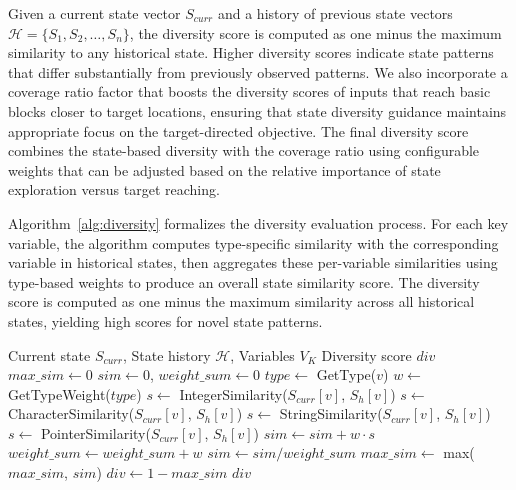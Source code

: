 \documentclass[review]{elsarticle}
\begin{document}
Given a current state vector $S_{curr}$ and a history of previous state vectors $\mathcal{H} = \{S_1, S_2, \ldots, S_n\}$, the diversity score is computed as one minus the maximum similarity to any historical state. Higher diversity scores indicate state patterns that differ substantially from previously observed patterns. We also incorporate a coverage ratio factor that boosts the diversity scores of inputs that reach basic blocks closer to target locations, ensuring that state diversity guidance maintains appropriate focus on the target-directed objective. The final diversity score combines the state-based diversity with the coverage ratio using configurable weights that can be adjusted based on the relative importance of state exploration versus target reaching.

Algorithm~\ref{alg:diversity} formalizes the diversity evaluation process. For each key variable, the algorithm computes type-specific similarity with the corresponding variable in historical states, then aggregates these per-variable similarities using type-based weights to produce an overall state similarity score. The diversity score is computed as one minus the maximum similarity across all historical states, yielding high scores for novel state patterns.

\begin{algorithm}[t]
\caption{State Diversity Evaluation}
\label{alg:diversity}
\begin{algorithmic}[1]
\REQUIRE Current state $S_{curr}$, State history $\mathcal{H}$, Variables $V_K$
\ENSURE Diversity score $div$
\STATE $max\_sim \leftarrow 0$
    \STATE $sim \leftarrow 0$, $weight\_sum \leftarrow 0$
        \STATE $type \leftarrow$ GetType($v$)
        \STATE $w \leftarrow$ GetTypeWeight($type$)
            \STATE $s \leftarrow$ IntegerSimilarity($S_{curr}[v]$, $S_h[v]$)
            \STATE $s \leftarrow$ CharacterSimilarity($S_{curr}[v]$, $S_h[v]$)
            \STATE $s \leftarrow$ StringSimilarity($S_{curr}[v]$, $S_h[v]$)
            \STATE $s \leftarrow$ PointerSimilarity($S_{curr}[v]$, $S_h[v]$)
        \ENDIF
        \STATE $sim \leftarrow sim + w \cdot s$
        \STATE $weight\_sum \leftarrow weight\_sum + w$
    \ENDFOR
    \STATE $sim \leftarrow sim / weight\_sum$
    \STATE $max\_sim \leftarrow$ max($max\_sim$, $sim$)
\ENDFOR
\STATE $div \leftarrow 1 - max\_sim$
\RETURN $div$
\end{algorithmic}
\end{algorithm}
\end{document}
